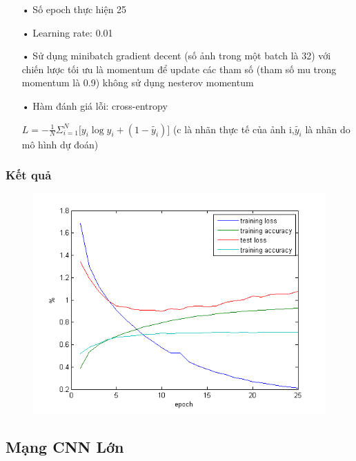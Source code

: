 \documentclass[a4paper,12pt]{report}
\begin{document}
\begin{itemize}
\begin{figure}[h]
\begin{center}
\end{center}
\end{figure}
\begin{itemize}
\item[•] Số epoch thực hiện 25
\item[•] Learning rate: 0.01
\item[•] Sử dụng minibatch gradient decent (số ảnh trong một batch là 32) với chiến lược tối ưu là momentum để update các tham số (tham số mu trong momentum là 0.9) không sử dụng nesterov momentum
\item[•] Hàm đánh giá lỗi: cross-entropy \\
\begin{center}
$L = -\frac{1}{N}\Sigma_{i=1}^{N}\big[y_i\log y_i + (1-\tilde{y_i})\big]$ (c là nhãn thực tế của ảnh i,$\tilde{y_i}$ là nhãn do mô hình dự đoán)
\end{center}
\end{itemize}
\end{itemize}
\subsubsection{Kết quả}
\begin{figure}[h]
\begin{center}
\includegraphics[width =1.0 \textwidth]{testImg.png}
\end{center}
\end{figure}
\subsection{Mạng CNN Lớn}
\end{document}
